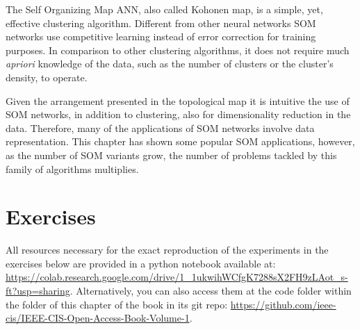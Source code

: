 The Self Organizing Map ANN, also called Kohonen map, is a simple, yet, effective clustering algorithm. Different from other neural networks SOM networks use competitive learning instead of error correction for training purposes. In comparison to other clustering algorithms, it does not require much \textit{apriori} knowledge of the data, such as the number of clusters or the cluster's density, to operate. 

Given the arrangement presented in the topological map it is intuitive the use of SOM networks, in addition to clustering, also for dimensionality reduction in the data. Therefore, many of the applications of SOM networks involve data representation. This chapter has shown some popular SOM applications, however, as the number of SOM variants grow, the number of problems tackled by this family of algorithms multiplies.  

\section{Exercises}

All resources necessary for the exact reproduction of the experiments in the exercises below are provided in a python notebook available at: \url{https://colab.research.google.com/drive/1_1ukwihWCfgK7288sX2FH9zLAot_s-ft?usp=sharing}. Alternatively, you can also access them at the code folder within the folder of this chapter of the book in its git repo: \url{https://github.com/ieee-cis/IEEE-CIS-Open-Access-Book-Volume-1}.

